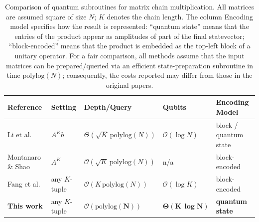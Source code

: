 \documentclass[a4paper,UKenglish,cleveref,autoref,thm-restate]{socg-lipics-v2021}
\begin{document}
\begin{table}[t]
  \caption{Comparison of quantum subroutines for matrix chain multiplication. All matrices are assumed square of size $N$; $K$ denotes the chain length. The column Encoding model specifies how the result is represented: ``quantum state'' means that the entries of the product appear as amplitudes of part of the final statevector; ``block-encoded'' means that the product is embedded as the top-left block of a unitary operator. For a fair comparison, all methods assume that the input matrices can be prepared/queried via an efficient state-preparation subroutine in time $\mathrm{polylog}(N)$; consequently, the costs reported may differ from those in the original papers.} 
  \label{tab:comparison}
  \centering
  \setlength{\tabcolsep}{4pt}%
  \begin{tabular}{@{}lllll@{}}
    \hline
    \textbf{Reference} & \textbf{Setting} & \textbf{Depth/Query} & \textbf{Qubits}
    & \textbf{Encoding Model} \\
    \hline 
    Li et al.~\cite{li2025faster}
      & $A^K b$
      & $\Theta(\sqrt{K}\,\mathrm{polylog}(N))$
      & $\mathcal{O}(\log N)$
      & block / quantum state \\
    Montanaro \& Shao~\cite{montanaro2024quantum}
      & $A^K$
      & $\mathcal{O}(\sqrt{K}\,\mathrm{polylog}(N))$
      & n/a
      & block-encoded \\
    Fang et al.~\cite{Fang_2023}
      & any $K$-tuple
      & $\mathcal{O}(K\,\mathrm{polylog}(N))$
      & $\mathcal{O}(\log K)$
      & block-encoded \\
    \hline
    \textbf{This work}
      & any $K$-tuple
      & $\boldsymbol{\mathcal{O}(\mathrm{polylog}(N))}$
      & $\boldsymbol{\Theta(K\,\log N)}$
      & \textbf{quantum state} \\
    \hline
  \end{tabular}
\end{table}
\end{document}
